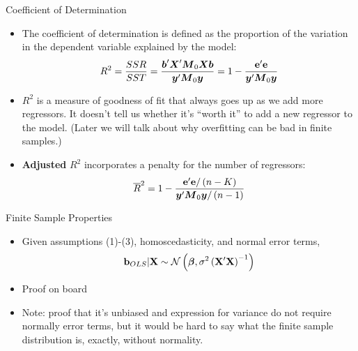 \begin{frame}{Coefficient of Determination}
\begin{itemize}
	\item The coefficient of determination is defined as the proportion of the variation in the dependent variable
	explained by the model:\[
	R^{2} = \frac{SSR}{SST} =  \frac{\boldsymbol{b}'\boldsymbol{X}'\boldsymbol{M}_{0}\boldsymbol{X}\boldsymbol{b}}{\boldsymbol{y}'\boldsymbol{M}_{0}\boldsymbol{y}}
	= 1 -  \frac{{\bf e}'{\bf e}}{\boldsymbol{y}'\boldsymbol{M}_{0}\boldsymbol{y}}
\]

	\smallskip
	\item $R^{2}$ is a measure of goodness of fit that always goes up as we add more regressors. It doesn't 
	tell us whether it's ``worth it'' to add a new regressor to the model. (Later we will talk about why overfitting
	can be bad in finite samples.)

\smallskip
	\item {\bf Adjusted} $R^{2}$ incorporates a penalty for the number of regressors:
	\[
	\overline{R}^{2} 	= 1 -  \frac{{\bf e}'{\bf e}/\left(n-K\right)}{\boldsymbol{y}'\boldsymbol{M}_{0}\boldsymbol{y}/\left(n-1\right)}
	\]
\end{itemize}
\end{frame}




\begin{frame}{Finite Sample Properties}
\begin{itemize}
	\item Given assumptions (1)-(3), homoscedasticity, and normal error terms, \[
	{\bf b}_{OLS} | {\bf X} \sim \mathcal{N}\left(\boldsymbol{\beta},\sigma^{2} \left({\bf X}'{\bf X}  \right)^{-1} \right)
	\]





	\item Proof on board

	\item Note: proof that it's unbiased and expression for variance
	do not require normally error terms, but it would be hard to say what the finite sample
	distribution is, exactly, without normality. 

\end{itemize}
\end{frame}




